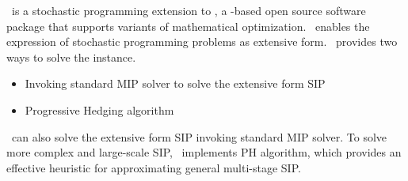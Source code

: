 \pysp\ is a stochastic programming extension to \pyomo, a \python-based open source software package that supports variants of mathematical optimization. \pysp\ enables the expression of stochastic programming problems as extensive form. \pysp\ provides two ways to solve the instance. 
\begin{itemize}
	\item Invoking standard MIP solver to solve the extensive form SIP
	\item Progressive Hedging algorithm
\end{itemize}
\pysp\ can also solve the extensive form SIP invoking standard MIP solver. To solve more complex and large-scale SIP, \pysp\ implements PH algorithm, which provides an effective heuristic for approximating general multi-stage SIP.



